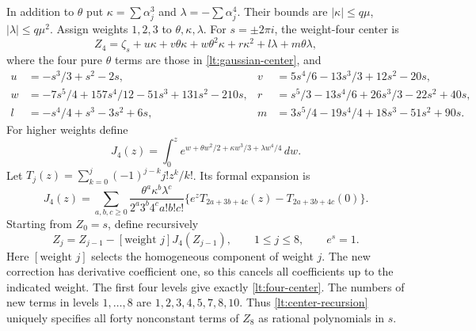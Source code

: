 \documentclass[11pt,reqno]{amsart}
\numberwithin{equation}{section}
\theoremstyle{definition}
\theoremstyle{remark}
\begin{document}
In addition to $\theta$ put $\kappa=\sum\alpha_j^3$ and
$\lambda=-\sum\alpha_j^4$. Their bounds are
$|\kappa|\le q\mu$, $|\lambda|\le q\mu^2$. Assign weights
$1,2,3$ to $\theta,\kappa,\lambda$. For $s=\pm2\pi i$, the
weight-four center is
\begin{equation}\label{lt:four-center}
 Z_4=\zeta_s+u\kappa+v\theta\kappa+w\theta^2\kappa
                    +r\kappa^2+l\lambda+m\theta\lambda,
\end{equation}
where the four pure $\theta$ terms are those in
\eqref{lt:gaussian-center}, and
\begin{align*}
 u&=-s^3/3+s^2-2s,&
 v&=5s^4/6-13s^3/3+12s^2-20s,\\
 w&=-7s^5/4+157s^4/12-51s^3+131s^2-210s,&
 r&=s^5/3-13s^4/6+26s^3/3-22s^2+40s,\\
 l&=-s^4/4+s^3-3s^2+6s,&
 m&=3s^5/4-19s^4/4+18s^3-51s^2+90s.
\end{align*}
For higher weights define
\[
 J_4(z)=\int_0^ze^{w+\theta w^2/2+\kappa w^3/3+\lambda w^4/4}\,dw.
\]
Let $T_j(z)=\sum_{k=0}^j(-1)^{j-k}j!z^k/k!$. Its formal expansion is
\[
 J_4(z)=\sum_{a,b,c\ge0}
 \frac{\theta^a\kappa^b\lambda^c}{2^a3^b4^c a!b!c!}
 \{e^zT_{2a+3b+4c}(z)-T_{2a+3b+4c}(0)\}.
\]
Starting from $Z_0=s$, define recursively
\begin{equation}\label{lt:center-recursion}
 Z_j=Z_{j-1}-[\text{weight }j]J_4(Z_{j-1}),
        \qquad 1\le j\le8,\qquad e^s=1.
\end{equation}
Here $[\text{weight }j]$ selects the homogeneous component of weight $j$.
The new correction has derivative coefficient one, so this cancels
all coefficients up to the indicated weight. The first four levels
give exactly \eqref{lt:four-center}. The numbers of new terms in
levels $1,\ldots,8$ are $1,2,3,4,5,7,8,10$. Thus
\eqref{lt:center-recursion} uniquely specifies all forty nonconstant
terms of $Z_8$ as rational polynomials in $s$.
\end{document}
